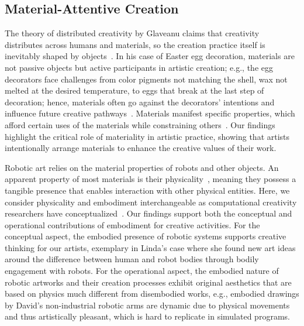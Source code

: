 \subsection{Material-Attentive Creation}

The theory of distributed creativity by Glaveanu claims that creativity distributes across humans and materials, so the creation practice itself is inevitably shaped by objects~\cite{glaveanu_distributed_2014}. In his case of Easter egg decoration, materials are not passive objects but active participants in artistic creation; e.g., the egg decorators face challenges from color pigments not matching the shell, wax not melted at the desired temperature, to eggs that break at the last step of decoration; hence, materials often go against the decorators' intentions and influence future creative pathways~\cite{glaveanu_distributed_2014}.
Materials manifest specific properties, which afford certain uses of the materials while constraining others~\cite{leonardi2012materiality}. Our findings highlight the critical role of materiality in artistic practice, showing that artists intentionally arrange materials to enhance the creative values of their work.

Robotic art relies on the material properties of robots and other objects. An apparent property of most materials is their physicality~\cite{leonardi2012materiality}, meaning they possess a tangible presence that enables interaction with other physical entities. Here, we consider physicality and embodiment interchangeable as computational creativity researchers have conceptualized~\cite{guckelsberger2021embodiment}.
Our findings support both the conceptual and operational contributions of embodiment for creative activities. For the conceptual aspect, the embodied presence of robotic systems supports creative thinking for our artists, exemplary in Linda's case where she found new art ideas around the difference between human and robot bodies through bodily engagement with robots. 
For the operational aspect, the embodied nature of robotic artworks and their creation processes exhibit original aesthetics that are based on physics much different from disembodied works, e.g., embodied drawings by David's non-industrial robotic arms are dynamic due to physical movements and thus artistically pleasant, which is hard to replicate in simulated programs.

